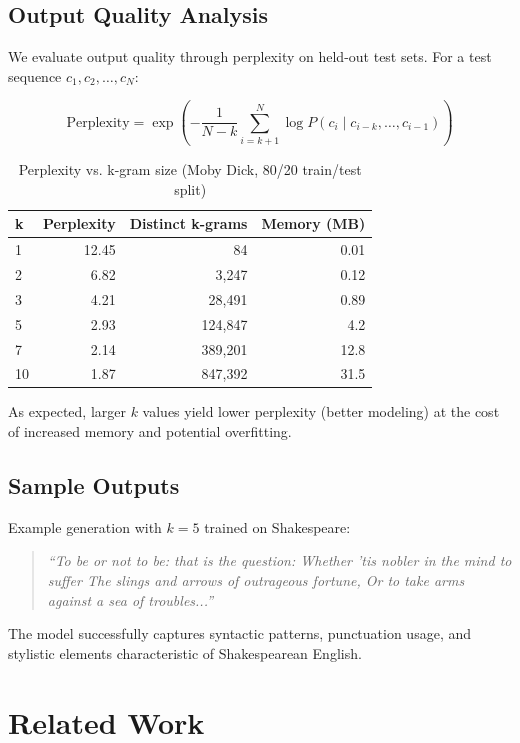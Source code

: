 \documentclass[11pt,letterpaper]{article}
\begin{document}
\subsection{Output Quality Analysis}

We evaluate output quality through perplexity on held-out test sets. For a test sequence $c_1, c_2, \ldots, c_N$:

\begin{equation}
\text{Perplexity} = \exp\left(-\frac{1}{N-k}\sum_{i=k+1}^{N} \log P(c_i \mid c_{i-k}, \ldots, c_{i-1})\right)
\end{equation}

\begin{table}[h]
\centering
\caption{Perplexity vs. k-gram size (Moby Dick, 80/20 train/test split)}
\label{tab:perplexity}
\begin{tabular}{|l|r|r|r|}\hline
\textbf{k} & \textbf{Perplexity} & \textbf{Distinct k-grams} & \textbf{Memory (MB)} \\
\hline
1 & 12.45 & 84 & 0.01 \\
2 & 6.82 & 3,247 & 0.12 \\
3 & 4.21 & 28,491 & 0.89 \\
5 & 2.93 & 124,847 & 4.2 \\
7 & 2.14 & 389,201 & 12.8 \\
10 & 1.87 & 847,392 & 31.5 \\
\hline
\end{tabular}
\end{table}

As expected, larger $k$ values yield lower perplexity (better modeling) at the cost of increased memory and potential overfitting.

\subsection{Sample Outputs}

Example generation with $k=5$ trained on Shakespeare:

\begin{quote}
\textit{``To be or not to be: that is the question: Whether 'tis nobler in the mind to suffer The slings and arrows of outrageous fortune, Or to take arms against a sea of troubles...''}
\end{quote}

The model successfully captures syntactic patterns, punctuation usage, and stylistic elements characteristic of Shakespearean English.

\section{Related Work}\label{sec:related}
\end{document}
